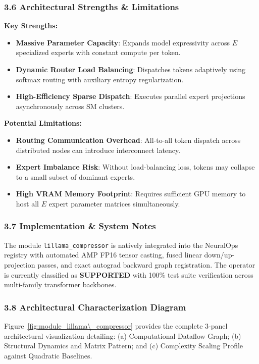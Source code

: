 \subsubsection*{3.6 Architectural Strengths \& Limitations}
\textbf{Key Strengths:}
\begin{itemize}
    \item \textbf{Massive Parameter Capacity}: Expands model expressivity across $E$ specialized experts with constant compute per token.
    \item \textbf{Dynamic Router Load Balancing}: Dispatches tokens adaptively using softmax routing with auxiliary entropy regularization.
    \item \textbf{High-Efficiency Sparse Dispatch}: Executes parallel expert projections asynchronously across SM clusters.
\end{itemize}

\textbf{Potential Limitations:}
\begin{itemize}
    \item \textbf{Routing Communication Overhead}: All-to-all token dispatch across distributed nodes can introduce interconnect latency.
    \item \textbf{Expert Imbalance Risk}: Without load-balancing loss, tokens may collapse to a small subset of dominant experts.
    \item \textbf{High VRAM Memory Footprint}: Requires sufficient GPU memory to host all $E$ expert parameter matrices simultaneously.
\end{itemize}

\subsubsection*{3.7 Implementation \& System Notes}
The module \texttt{lillama\_compressor} is natively integrated into the NeuralOps registry with automated AMP FP16 tensor casting, fused linear down/up-projection passes, and exact autograd backward graph registration. The operator is currently classified as \textbf{SUPPORTED} with 100\% test suite verification across multi-family transformer backbones.

\subsubsection*{3.8 Architectural Characterization Diagram}
Figure~\ref{fig:module_lillama\_compressor} provides the complete 3-panel architectural visualization detailing: (a) Computational Dataflow Graph; (b) Structural Dynamics and Matrix Pattern; and (c) Complexity Scaling Profile against Quadratic Baselines.


